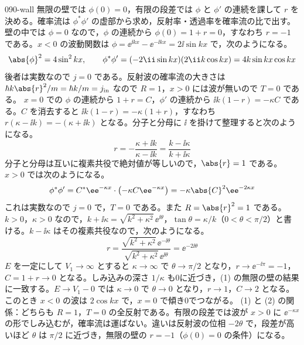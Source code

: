 \documentclass[uplatex,dvipdfmx,a4paper,11pt]{jsarticle}
\begin{document}
\begin{kaisetsu}{090-wall}
\houshin 無限の壁では $\phi(0)=0$，有限の段差では $\phi$ と $\phi'$ の連続を課して $r$ を決める。確率流は $\phi^{*}\phi'$ の虚部から求め，反射率・透過率を確率流の比で出す。
\keisan
{} 壁の中では $\phi=0$ なので，$\phi$ の連続から $\phi(0)=1+r=0$，すなわち $r=-1$ である。$x<0$ の波動関数は $\phi=\ee^{\ii kx}-\ee^{-\ii kx}=2\ii\sin kx$ で，次のようになる。
\[ \abs{\phi}^{2}=4\sin^{2}kx,\qquad \phi^{*}\phi'=(-2\ii\sin kx)(2\ii k\cos kx)=4k\sin kx\cos kx \]
後者は実数なので $j=0$ である。反射波の確率流の大きさは $\hbar k\abs{r}^{2}/m=\hbar k/m=j_{\mathrm{in}}$ なので $R=1$，$x>0$ には波が無いので $T=0$ である。
 $x=0$ での $\phi$ の連続から $1+r=C$，$\phi'$ の連続から $\ii k(1-r)=-\kappa C$ である。$C$ を消去すると $\ii k(1-r)=-\kappa(1+r)$，すなわち $r(\kappa-\ii k)=-(\kappa+\ii k)$ となる。分子と分母に $\ii$ を掛けて整理すると次のようになる。
\[ r=-\frac{\kappa+\ii k}{\kappa-\ii k}=\frac{k-\ii\kappa}{k+\ii\kappa} \]
分子と分母は互いに複素共役で絶対値が等しいので，$\abs{r}=1$ である。$x>0$ では次のようになる。
\[ \phi^{*}\phi'=C^{*}\ee^{-\kappa x}\cdot\left(-\kappa C\ee^{-\kappa x}\right)=-\kappa\abs{C}^{2}\ee^{-2\kappa x} \]
これは実数なので $j=0$ で，$T=0$ である。また $R=\abs{r}^{2}=1$ である。
 $k>0$，$\kappa>0$ なので，$k+\ii\kappa=\sqrt{k^{2}+\kappa^{2}}\,\ee^{\ii\theta}$，$\tan\theta=\kappa/k$（$0<\theta<\pi/2$）と書ける。$k-\ii\kappa$ はその複素共役なので，次のようになる。
\[ r=\frac{\sqrt{k^{2}+\kappa^{2}}\,\ee^{-\ii\theta}}{\sqrt{k^{2}+\kappa^{2}}\,\ee^{\ii\theta}}=\ee^{-2\ii\theta} \]
$E$ を一定にして $V_{1}\to\infty$ とすると $\kappa\to\infty$ で $\theta\to\pi/2$ となり，$r\to\ee^{-\ii\pi}=-1$，$C=1+r\to 0$ となる。しみ込みの深さ $1/\kappa$ も0に近づき，(1) の無限の壁の結果に一致する。$E\to V_{1}-0$ では $\kappa\to 0$ で $\theta\to 0$ となり，$r\to 1$，$C\to 2$ となる。このとき $x<0$ の波は $2\cos kx$ で，$x=0$ で傾き0でつながる。
(1) と (2) の関係：どちらも $R=1$，$T=0$ の全反射である。有限の段差では波が $x>0$ に $\ee^{-\kappa x}$ の形でしみ込むが，確率流は運ばない。違いは反射波の位相 $-2\theta$ で，段差が高いほど $\theta$ は $\pi/2$ に近づき，無限の壁の $r=-1$（$\phi(0)=0$ の条件）になる。
\begin{ronten}

\end{ronten}
\end{kaisetsu}
\end{document}
